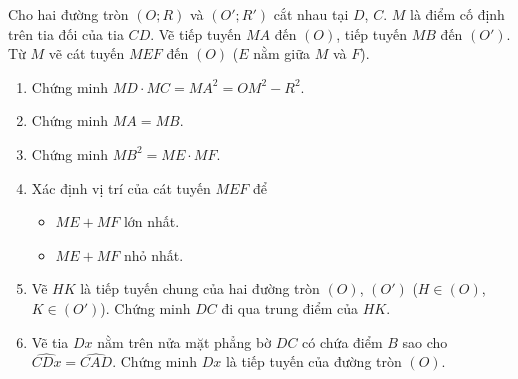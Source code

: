 \begin{bt}%
	Cho hai đường tròn $(O;R)$ và $(O';R')$ cắt nhau tại $D$, $C$. $M$ là điểm cố định trên tia đối của tia $CD$. Vẽ tiếp tuyến $MA$ đến $(O)$, tiếp tuyến $MB$ đến $(O')$. Từ $M$ vẽ cát tuyến $MEF$ đến $(O)$ ($E$ nằm giữa $M$ và $F$).
	\begin{enumerate}
		\item Chứng minh $MD \cdot MC=MA^2=OM^2-R^2$.
		\item Chứng minh $MA=MB$.
		\item Chứng minh $MB^2=ME \cdot MF$.
		\item Xác định vị trí của cát tuyến $MEF$ để
		\begin{itemize}
			\item $ME+MF$ lớn nhất.
			\item $ME+MF$ nhỏ nhất.
		\end{itemize}
		\item Vẽ $HK$ là tiếp tuyến chung của hai đường tròn $(O)$, $(O')$ ($H \in (O)$, $K \in (O')$). Chứng minh $DC$ đi qua trung điểm của $HK$.
		\item Vẽ tia $Dx$ nằm trên nửa mặt phẳng bờ $DC$ có chứa điểm $B$ sao cho $\widehat{CDx}=\widehat{CAD}$. Chứng minh $Dx$ là tiếp tuyến của đường tròn $(O)$.
	\end{enumerate}
	\loigiai{
		
}
\end{bt}
